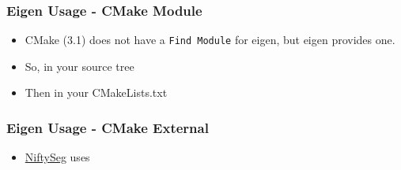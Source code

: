 \subsubsection{Eigen Usage - CMake
Module}\label{eigen-usage---cmake-module}

\begin{itemize}
\itemsep1pt\parskip0pt
\item
  CMake (3.1) does not have a \texttt{Find Module} for eigen, but eigen
  provides one.
\item
  So, in your source tree
\end{itemize}

\begin{Shaded}
\begin{Highlighting}[]
 
 \KeywordTok{<}\KeywordTok{>}
\end{Highlighting}
\end{Shaded}

\begin{itemize}
\itemsep1pt\parskip0pt
\item
  Then in your CMakeLists.txt
\end{itemize}

\begin{Shaded}
\begin{Highlighting}[]
\NormalTok{(} \NormalTok{)}
\NormalTok{(}\NormalTok{)}
\end{Highlighting}
\end{Shaded}

\subsubsection{Eigen Usage - CMake
External}\label{eigen-usage---cmake-external}

\begin{itemize}
\itemsep1pt\parskip0pt
\item
  \href{http://sourceforge.net/projects/niftyseg/}{NiftySeg} uses
\end{itemize}

